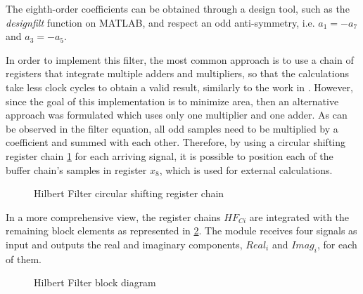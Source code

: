 The eighth-order coefficients can be obtained through a design tool, such as the \textit{designfilt} function on MATLAB, and respect an odd anti-symmetry, i.e. $a_{1} = - a_{7}$ and $a_{3} = - a_{5}$.

In order to implement this filter, the most common approach is to use a chain of registers that integrate multiple adders and multipliers, so that the calculations take less clock cycles to obtain a valid result, similarly to the work in \cite{hilbert-fpga}. However, since the goal of this implementation is to minimize area, then an alternative approach was formulated which uses only one multiplier and one adder. As can be observed in the filter equation, all odd samples need to be multiplied by a coefficient and summed with each other. Therefore, by using a circular shifting register chain \ref{fig:hilbert-chai} for each arriving signal, it is possible to position each of the buffer chain's samples in register $x_8$, which is used for external calculations.

\begin{figure}[!htbp]
	\captionsetup{justification=centering,margin=2cm}
	\caption{Hilbert Filter circular shifting register chain}
	\label{fig:hilbert-chai}
\end{figure}

In a more comprehensive view, the register chains $HF_{Ci}$ are integrated with the remaining block elements as represented in \ref{fig:hilbert-all}. The module receives four signals as input and outputs the real and imaginary components, $Real_i$ and $Imag_i$, for each of them.

\begin{figure}[!htbp]
	\captionsetup{justification=centering,margin=2cm}
	\caption{Hilbert Filter block diagram}
	\label{fig:hilbert-all}
\end{figure}

